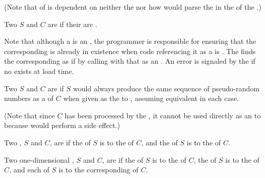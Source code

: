 (Note that  of
 is dependent
on neither the  nor how  would
parse the  in the  of the .)


Two  $S$ and $C$ are  if their  are .

Note that although a   is an ,
the programmer is responsible for ensuring that the corresponding  is
already in existence when code referencing it as a   
is .  The  finds the corresponding  
as if by calling  with that  as an .
An error is signaled by the  if no  exists at load time.

 
Two  $S$ and $C$ are  if $S$
would always produce the same sequence of pseudo-random numbers 
as a  of $C$
when given as the   to , 
assuming equivalent   in each case.

(Note that since $C$ has been processed by the ,
it cannot be used directly as an  to 
because  would perform a side effect.)


Two , $S$ and $C$, are  if
    the  of $S$ is  to the  of $C$,
and the  of $S$ is  to the  of $C$.


Two one-dimensional , $S$ and $C$, are  if
     the  of $S$ is  to the  of $C$,
     the  of $S$ is  to
     the  of $C$,
 and each   of $S$ is  to
      the corresponding  of $C$.

